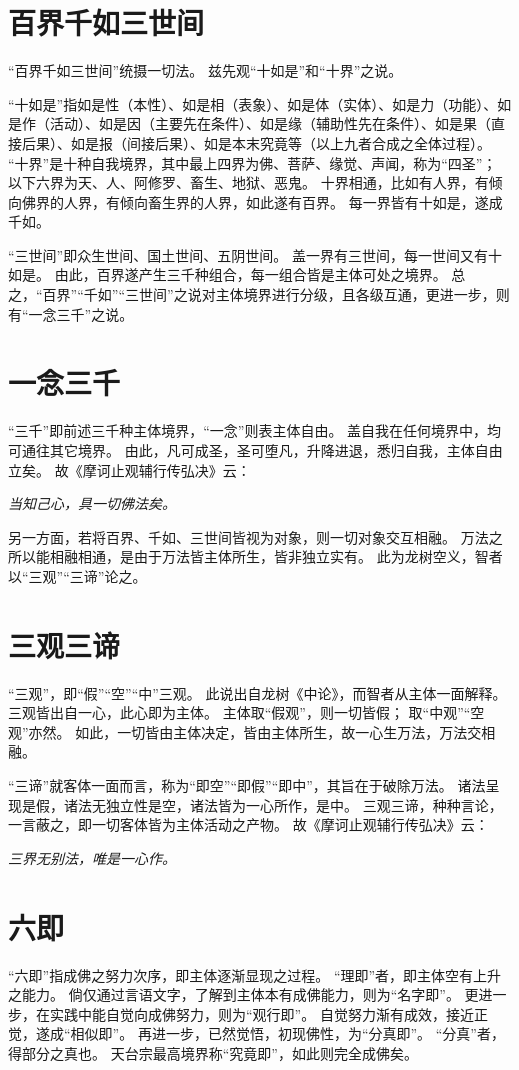 \documentclass[11pt]{article}
\begin{document}
\section{百界千如三世间}
“百界千如三世间”统摄一切法。
兹先观“十如是”和“十界”之说。

\par

“十如是”指如是性（本性）、如是相（表象）、如是体（实体）、如是力（功能）、如是作（活动）、如是因（主要先在条件）、如是缘（辅助性先在条件）、如是果（直接后果）、如是报（间接后果）、如是本末究竟等（以上九者合成之全体过程）。
“十界”是十种自我境界，其中最上四界为佛、菩萨、缘觉、声闻，称为“四圣”；
以下六界为天、人、阿修罗、畜生、地狱、恶鬼。
十界相通，比如有人界，有倾向佛界的人界，有倾向畜生界的人界，如此遂有百界。
每一界皆有十如是，遂成千如。

\par

“三世间”即众生世间、国土世间、五阴世间。
盖一界有三世间，每一世间又有十如是。
由此，百界遂产生三千种组合，每一组合皆是主体可处之境界。
总之，“百界”“千如”“三世间”之说对主体境界进行分级，且各级互通，更进一步，则有“一念三千”之说。

\section{一念三千}
“三千”即前述三千种主体境界，“一念”则表主体自由。
盖自我在任何境界中，均可通往其它境界。
由此，凡可成圣，圣可堕凡，升降进退，悉归自我，主体自由立矣。
故《摩诃止观辅行传弘决》云：

\textit{当知己心，具一切佛法矣。}

另一方面，若将百界、千如、三世间皆视为对象，则一切对象交互相融。
万法之所以能相融相通，是由于万法皆主体所生，皆非独立实有。
此为龙树空义，智者以“三观”“三谛”论之。

\section{三观三谛}
“三观”，即“假”“空”“中”三观。
此说出自龙树《中论》，而智者从主体一面解释。
三观皆出自一心，此心即为主体。
主体取“假观”，则一切皆假；
取“中观”“空观”亦然。
如此，一切皆由主体决定，皆由主体所生，故一心生万法，万法交相融。

\par

“三谛”就客体一面而言，称为“即空”“即假”“即中”，其旨在于破除万法。
诸法呈现是假，诸法无独立性是空，诸法皆为一心所作，是中。
三观三谛，种种言论，一言蔽之，即一切客体皆为主体活动之产物。
故《摩诃止观辅行传弘决》云：

\textit{三界无别法，唯是一心作。}

\section{六即}
“六即”指成佛之努力次序，即主体逐渐显现之过程。
“理即”者，即主体空有上升之能力。
倘仅通过言语文字，了解到主体本有成佛能力，则为“名字即”。
更进一步，在实践中能自觉向成佛努力，则为“观行即”。
自觉努力渐有成效，接近正觉，遂成“相似即”。
再进一步，已然觉悟，初现佛性，为“分真即”。
“分真”者，得部分之真也。
天台宗最高境界称“究竟即”，如此则完全成佛矣。
  
\end{document}
